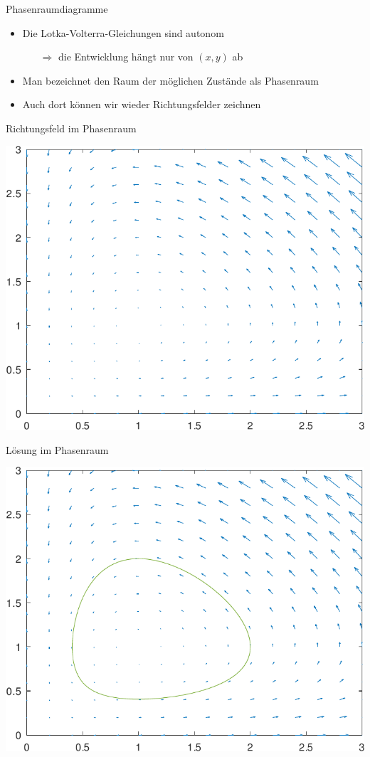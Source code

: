 \begin{frame}{Phasenraumdiagramme}
  \begin{itemize}
  \item Die Lotka-Volterra-Gleichungen sind autonom
    \begin{itemize}
    \item[$\Rightarrow$] die Entwicklung hängt nur von $(x,y)$ ab 
    \end{itemize}
  \item Man bezeichnet den Raum der möglichen Zustände als Phasenraum
  \item Auch dort können wir wieder Richtungsfelder zeichnen
  \end{itemize}
\end{frame}

\begin{frame}{Richtungsfeld im Phasenraum}
  \begin{center}
    \includegraphics[width=.7\textwidth]{octave/volterra-vectors-crop.pdf}
  \end{center}
\end{frame}

\begin{frame}{Lösung im Phasenraum}
  \begin{center}
    \includegraphics[width=.7\textwidth]{octave/volterra-phasespace-crop.pdf}
  \end{center}  
\end{frame}

